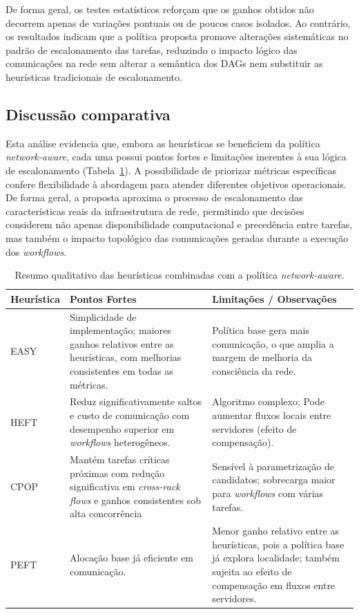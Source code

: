 \documentclass[12pt]{article}
\begin{document}
De forma geral, os testes estatísticos reforçam que os ganhos obtidos não decorrem apenas de variações pontuais ou de poucos casos isolados. 
%
Ao contrário, os resultados indicam que a política proposta promove alterações sistemáticas no padrão de escalonamento das tarefas, reduzindo o impacto lógico das comunicações na rede sem alterar a semântica dos DAGs nem substituir as heurísticas tradicionais de escalonamento.


\subsection{Discussão comparativa}
\label{subsec:discussao_comparativa}

Esta análise evidencia que, embora as heurísticas se beneficiem da política \textit{network-aware}, cada uma possui pontos fortes e limitações inerentes à sua lógica de escalonamento (Tabela~\ref{tab:heuristicas_com_network}). 
%
A possibilidade de priorizar métricas específicas confere flexibilidade à abordagem para atender diferentes objetivos operacionais.
%
De forma geral, a proposta aproxima o processo de escalonamento das características reais da infraestrutura de rede, permitindo que decisões considerem não apenas disponibilidade computacional e precedência entre tarefas, mas também o impacto topológico das comunicações geradas durante a execução dos \textit{workflows}. 

\begin{table}[h!]
\scriptsize
\centering
\caption{Resumo qualitativo das heurísticas combinadas com a política \textit{network-aware}.}
\label{tab:heuristicas_com_network}
\begin{tabular}{l p{5cm} p{7.5cm}}
\toprule
\textbf{Heurística} & \textbf{Pontos Fortes} & \textbf{Limitações / Observações} \\
\midrule
EASY & {\raggedright Simplicidade de implementação; maiores ganhos relativos entre as heurísticas, com melhorias consistentes em todas as métricas.} & {\raggedright Política base gera mais comunicação, o que amplia a margem de melhoria da consciência da rede.} \\
\midrule
HEFT & {\raggedright Reduz significativamente saltos e custo de comunicação com desempenho superior em \textit{workflows} heterogêneos.} & {\raggedright Algoritmo complexo; Pode aumentar fluxos locais entre servidores (efeito de compensação).} \\
\midrule
CPOP & {\raggedright Mantém tarefas críticas próximas com redução significativa em \textit{cross-rack flows} e ganhos consistentes sob alta concorrência} & {\raggedright Sensível à parametrização de candidatos; sobrecarga maior para \textit{workflows} com várias tarefas.} \\
\midrule
PEFT & {\raggedright Alocação base já eficiente em comunicação.} & {\raggedright Menor ganho relativo entre as heurísticas, pois a política base já explora localidade; também sujeita ao efeito de compensação em fluxos entre servidores.} \\
\bottomrule
\end{tabular}
\end{table}
\end{document}
